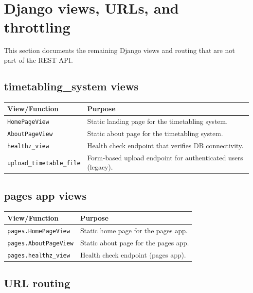 \section{Django views, URLs, and throttling}
\label{sec:backend:views}

This section documents the remaining Django views and routing that are not part of the REST API.

\subsection{timetabling\_system views}
\label{subsec:backend:views:timetabling}

\begin{longtable}{p{}p{}}
\toprule
\textbf{View/Function} & \textbf{Purpose} \\
\midrule
\texttt{HomePageView} & Static landing page for the timetabling system. \\
\texttt{AboutPageView} & Static about page for the timetabling system. \\
\texttt{healthz\_view} & Health check endpoint that verifies DB connectivity. \\
\texttt{upload\_timetable\_file} & Form-based upload endpoint for authenticated users (legacy). \\
\bottomrule
\end{longtable}

\subsection{pages app views}
\label{subsec:backend:views:pages}

\begin{longtable}{p{}p{}}
\toprule
\textbf{View/Function} & \textbf{Purpose} \\
\midrule
\texttt{pages.HomePageView} & Static home page for the pages app. \\
\texttt{pages.AboutPageView} & Static about page for the pages app. \\
\texttt{pages.healthz\_view} & Health check endpoint (pages app). \\
\bottomrule
\end{longtable}

\subsection{URL routing}
\label{subsec:backend:views:urls}


